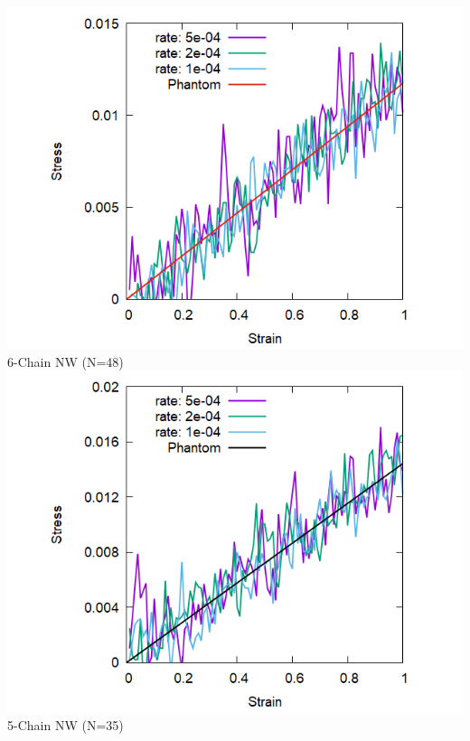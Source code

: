 \documentclass[12pt, dvipdfmx]{beamer}
\begin{document}
\begin{frame}
\begin{columns}[T, onlytextwidth]
		\centering
		\includegraphics[width=\textwidth]{Shear_Random_6chain_N48.png}
		6-Chain NW (N=48)
		\centering
			\includegraphics[width=\textwidth]{Shear_Random_5chain_N35.png}
			5-Chain NW (N=35)
	\end{columns}
\end{frame}
\end{document}
